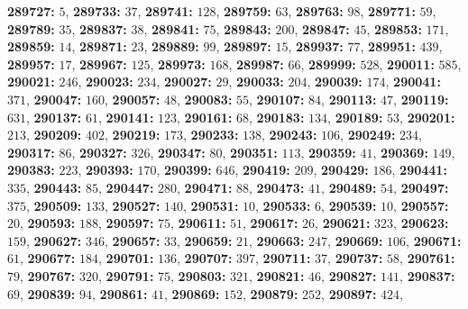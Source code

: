 \textsf{\bfseries 289727:} $5$, \textsf{\bfseries 289733:} $37$, \textsf{\bfseries 289741:} $128$, \textsf{\bfseries 289759:} $63$, \textsf{\bfseries 289763:} $98$, \textsf{\bfseries 289771:} $59$, \textsf{\bfseries 289789:} $35$, \textsf{\bfseries 289837:} $38$, \textsf{\bfseries 289841:} $75$, \textsf{\bfseries 289843:} $200$, \textsf{\bfseries 289847:} $45$, \textsf{\bfseries 289853:} $171$, \textsf{\bfseries 289859:} $14$, \textsf{\bfseries 289871:} $23$, \textsf{\bfseries 289889:} $99$, \textsf{\bfseries 289897:} $15$, \textsf{\bfseries 289937:} $77$, \textsf{\bfseries 289951:} $439$, \textsf{\bfseries 289957:} $17$, \textsf{\bfseries 289967:} $125$, \textsf{\bfseries 289973:} $168$, \textsf{\bfseries 289987:} $66$, \textsf{\bfseries 289999:} $528$, \textsf{\bfseries 290011:} $585$, \textsf{\bfseries 290021:} $246$, \textsf{\bfseries 290023:} $234$, \textsf{\bfseries 290027:} $29$, \textsf{\bfseries 290033:} $204$, \textsf{\bfseries 290039:} $174$, \textsf{\bfseries 290041:} $371$, \textsf{\bfseries 290047:} $160$, \textsf{\bfseries 290057:} $48$, \textsf{\bfseries 290083:} $55$, \textsf{\bfseries 290107:} $84$, \textsf{\bfseries 290113:} $47$, \textsf{\bfseries 290119:} $631$, \textsf{\bfseries 290137:} $61$, \textsf{\bfseries 290141:} $123$, \textsf{\bfseries 290161:} $68$, \textsf{\bfseries 290183:} $134$, \textsf{\bfseries 290189:} $53$, \textsf{\bfseries 290201:} $213$, \textsf{\bfseries 290209:} $402$, \textsf{\bfseries 290219:} $173$, \textsf{\bfseries 290233:} $138$, \textsf{\bfseries 290243:} $106$, \textsf{\bfseries 290249:} $234$, \textsf{\bfseries 290317:} $86$, \textsf{\bfseries 290327:} $326$, \textsf{\bfseries 290347:} $80$, \textsf{\bfseries 290351:} $113$, \textsf{\bfseries 290359:} $41$, \textsf{\bfseries 290369:} $149$, \textsf{\bfseries 290383:} $223$, \textsf{\bfseries 290393:} $170$, \textsf{\bfseries 290399:} $646$, \textsf{\bfseries 290419:} $209$, \textsf{\bfseries 290429:} $186$, \textsf{\bfseries 290441:} $335$, \textsf{\bfseries 290443:} $85$, \textsf{\bfseries 290447:} $280$, \textsf{\bfseries 290471:} $88$, \textsf{\bfseries 290473:} $41$, \textsf{\bfseries 290489:} $54$, \textsf{\bfseries 290497:} $375$, \textsf{\bfseries 290509:} $133$, \textsf{\bfseries 290527:} $140$, \textsf{\bfseries 290531:} $10$, \textsf{\bfseries 290533:} $6$, \textsf{\bfseries 290539:} $10$, \textsf{\bfseries 290557:} $20$, \textsf{\bfseries 290593:} $188$, \textsf{\bfseries 290597:} $75$, \textsf{\bfseries 290611:} $51$, \textsf{\bfseries 290617:} $26$, \textsf{\bfseries 290621:} $323$, \textsf{\bfseries 290623:} $159$, \textsf{\bfseries 290627:} $346$, \textsf{\bfseries 290657:} $33$, \textsf{\bfseries 290659:} $21$, \textsf{\bfseries 290663:} $247$, \textsf{\bfseries 290669:} $106$, \textsf{\bfseries 290671:} $61$, \textsf{\bfseries 290677:} $184$, \textsf{\bfseries 290701:} $136$, \textsf{\bfseries 290707:} $397$, \textsf{\bfseries 290711:} $37$, \textsf{\bfseries 290737:} $58$, \textsf{\bfseries 290761:} $79$, \textsf{\bfseries 290767:} $320$, \textsf{\bfseries 290791:} $75$, \textsf{\bfseries 290803:} $321$, \textsf{\bfseries 290821:} $46$, \textsf{\bfseries 290827:} $141$, \textsf{\bfseries 290837:} $69$, \textsf{\bfseries 290839:} $94$, \textsf{\bfseries 290861:} $41$, \textsf{\bfseries 290869:} $152$, \textsf{\bfseries 290879:} $252$, \textsf{\bfseries 290897:} $424$, 
